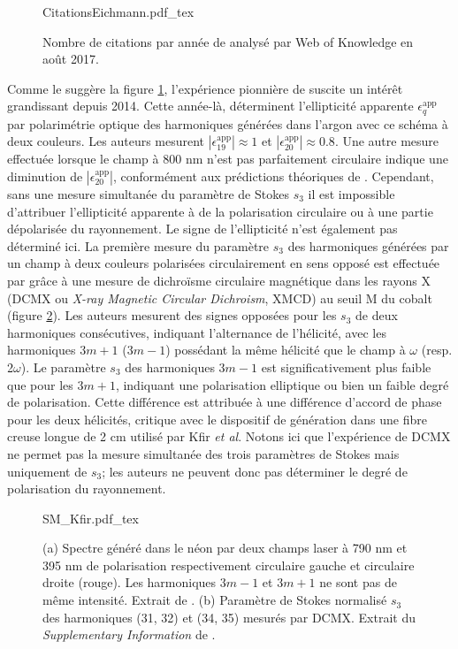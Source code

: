 \begin{figure}[ht]
\centering
\def\svgwidth{0.5\textwidth}
{CitationsEichmann.pdf_tex}
\caption{Nombre de citations par année de  analysé par Web of Knowledge en août 2017.}
\label{fig:CitationsEichmann}
\end{figure}

Comme le suggère la figure \ref{fig:CitationsEichmann}, l'expérience pionnière de  suscite un intérêt grandissant depuis 2014. Cette année-là,  déterminent l'ellipticité apparente $\epsilon_{q}^{\text{app}}$ par polarimétrie optique des harmoniques générées dans l'argon avec ce schéma à deux couleurs. Les auteurs mesurent $|\epsilon_{19}^{\text{app}}| \approx 1 $ et $|\epsilon_{20}^{\text{app}}| \approx 0.8$. Une autre mesure effectuée lorsque le champ à 800 nm n'est pas parfaitement circulaire indique une diminution de $|\epsilon_{20}^{\text{app}}|$, conformément aux prédictions théoriques de . Cependant, sans une mesure simultanée du paramètre de Stokes $s_3$ il est impossible d'attribuer l'ellipticité apparente à de la polarisation circulaire ou à une partie dépolarisée du rayonnement. Le signe de l'ellipticité n'est également pas déterminé ici. La première mesure du paramètre $s_3$ des harmoniques générées par un champ à deux couleurs polarisées circulairement en sens opposé est effectuée par  grâce à une mesure de dichroïsme circulaire magnétique dans les rayons X (DCMX ou \textit{X-ray Magnetic Circular Dichroism}, XMCD) au seuil M du cobalt (figure \ref{fig:SM_Kfir}). Les auteurs mesurent des signes opposées pour les $s_3$ de deux harmoniques consécutives, indiquant l'alternance de l'hélicité, avec les harmoniques $3m+1$ ($3m-1$) possédant la même hélicité que le champ à $\omega$ (resp. 2$\omega$). Le paramètre $s_3$ des harmoniques $3m-1$ est significativement plus faible que pour les $3m+1$, indiquant une polarisation elliptique ou bien un faible degré de polarisation. Cette différence est attribuée à une différence d'accord de phase pour les deux hélicités, critique avec le dispositif de génération dans une fibre creuse longue de 2 cm utilisé par Kfir \textit{et al}. Notons ici que l'expérience de DCMX ne permet pas la mesure simultanée des trois paramètres de Stokes mais uniquement de $s_3$; les auteurs ne peuvent donc pas déterminer le degré de polarisation du rayonnement.

\begin{figure}
\centering
\def\svgwidth{\textwidth}
{SM_Kfir.pdf_tex}
\caption{(a) Spectre généré dans le néon par deux champs laser à 790 nm et 395 nm de polarisation respectivement circulaire gauche et circulaire droite (rouge). Les harmoniques $3m-1$ et $3m+1$ ne sont pas de même intensité. Extrait de . (b) Paramètre de Stokes normalisé $s_3$ des harmoniques (31, 32) et (34, 35)  mesurés par DCMX. Extrait du \textit{Supplementary Information} de .}
\label{fig:SM_Kfir}
\end{figure}

